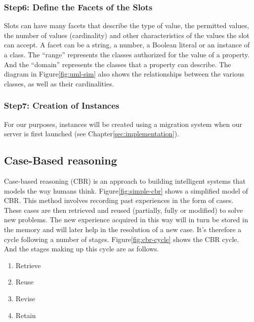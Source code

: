     
    \subsubsection{Step6: Define the Facets of the Slots}
    Slots can have many facets that describe the type of value, the permitted values, the number of values (cardinality) and other characteristics of the values the slot can accept. A facet can be a string, a number, a Boolean literal or an instance of a class. The “range” represents the classes authorized for the value of a property. And the “domain” represents the classes that a property can describe. The diagram in Figure\ref{fig:uml-sim} also shows the relationships between the various classes, as well as their cardinalities.
    
    
    \subsubsection{Step7: Creation of Instances}
    For our purposes, instances will be created using a migration system when our server is first launched (see Chapter\ref{sec:implementation}).
    

\subsection{Case-Based reasoning \label{subsec:cbr}}
Case-based reasoning (CBR) is an approach to building intelligent systems that models the way humans think. Figure\ref{fig:simple-cbr} shows a simplified model of CBR. This method involves recording past experiences in the form of cases. These cases are then retrieved and reused (partially, fully or modified) to solve new problems. The new experience acquired in this way will in turn be stored in the memory and will later help in the resolution of a new case. It's therefore a cycle following a number of stages. Figure\ref{fig:cbr-cycle} shows the CBR cycle. And the stages making up this cycle are as follows.
    
    \begin{enumerate}
        \item Retrieve
        \item Reuse
        \item Revise
        \item Retain
    \end{enumerate}
    

